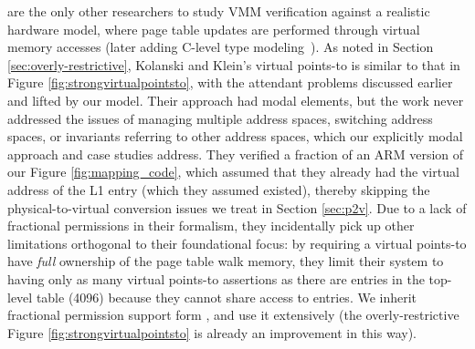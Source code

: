 \citet{kolanski08vstte} are the only other researchers to study VMM verification against a realistic hardware
model, where page table updates are performed through virtual memory accesses (later adding C-level type modeling~\cite{kolanski09tphols}).
As noted in Section \ref{sec:overly-restrictive}, Kolanski and Klein's virtual points-to is similar to that in Figure \ref{fig:strongvirtualpointsto},
with the attendant problems discussed earlier and lifted by our model. Their approach had modal elements,
but the work never addressed the issues of managing multiple address spaces, switching address spaces, or
invariants referring to other address spaces, which our explicitly modal approach and case studies address.
They verified a fraction of an ARM version of our Figure \ref{fig:mapping_code}, which assumed that they already had the virtual address
of the L1 entry (which they assumed existed), thereby skipping the physical-to-virtual conversion issues we treat in Section \ref{sec:p2v}.
Due to a lack of fractional permissions in their formalism, they incidentally pick up other limitations orthogonal to their
foundational focus: by requiring
a virtual points-to have \emph{full} ownership of the page table walk memory, they limit their system to having only as many
virtual points-to assertions as there are entries in the top-level table (4096) because they cannot share access to entries.
We inherit fractional permission support form \iris, and use it extensively (the overly-restrictive
Figure \ref{fig:strongvirtualpointsto} is already an improvement in this way).
 

